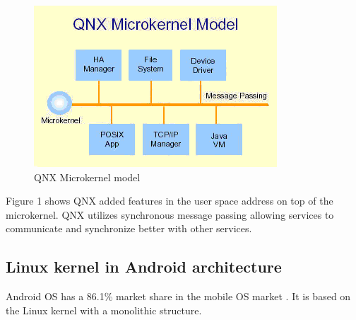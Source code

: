 \documentclass[conference]{IEEEtran}
\newcommand{\forceindent}{\leavevmode{\parindent=1em\indent}}
\begin{document}
\begin{figure}[h]
\caption{QNX Microkernel model}
\begin{center}
\includegraphics[scale=0.5]{./images/QNX_microkernel_mode.png}
\end{center}
\end{figure}

\forceindent Figure 1 shows QNX added features in the user space address on top of the microkernel. QNX utilizes synchronous message passing allowing services to communicate and synchronize better\cite{Burger} with other services.


\medskip
\subsection{Linux kernel in Android architecture}
\forceindent Android OS has a 86.1\% market share in the mobile OS market \cite{SMS}. It is based on the Linux kernel with a monolithic structure.
\end{document}
